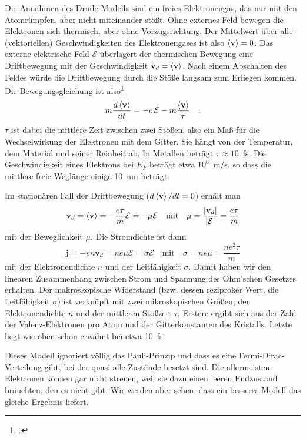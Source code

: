 Die Annahmen des Drude-Modells sind ein freies Elektronengas, das nur mit den  Atomrümpfen, aber nicht miteinander stößt. Ohne externes Feld bewegen die Elektronen sich thermisch, aber ohne Vorzugsrichtung. Der Mittelwert über alle (vektoriellen) Geschwindigkeiten des Elektronengases ist also $\braket{\mathbf{v}} = 0$. Das externe elektrische Feld $\mathcal{E}$ überlagert der thermischen Bewegung eine Driftbewegung mit der Geschwindigkeit $\mathbf{v}_d = \braket{\mathbf{v}}$. Nach einem Abschalten des Feldes würde die Driftbewegung durch die Stöße langsam zum Erliegen kommen. Die Bewegungsgleichung ist also\footcite{Singleton_band_theory,Simon_solid_state_basics}
\begin{equation}
   m \frac{d \braket{\mathbf{v}} }{dt} = -e \, \mathcal{E} - m \frac{\braket{\mathbf{v}} }{\tau} \quad .
\end{equation}
$\tau$ ist dabei die mittlere Zeit zwischen zwei Stößen, also ein Maß für die Wechselwirkung der Elektronen mit dem Gitter. Sie hängt von der Temperatur, dem Material und seiner Reinheit ab. In Metallen beträgt $\tau \approx 10$~fs. Die Geschwindigkeit eines Elektrons bei $E_F$ beträgt etwa $10^6$~m/s, so dass die mittlere freie Weglänge einige 10~nm beträgt.

Im stationären Fall der Driftbewegung
($d \braket{\mathbf{v}} / dt = 0$) erhält man   
\begin{equation}
   \mathbf{v}_d =\braket{\mathbf{v}} =  - \frac{e \tau}{m} \mathcal{E} = - \mu \mathcal{E} 
   \quad \text{mit} \quad
    \mu = \frac{| \mathbf{v}_d |}{|\mathcal{E}|} = \frac{e \tau}{m} \label{eq:2_def_beweglichkeit}
\end{equation}
mit der Beweglichkeit $\mu$. Die Stromdichte ist dann
\begin{equation}
   \mathbf{j} = -e n  \mathbf{v}_d = n e \mu \mathcal{E} = \sigma \mathcal{E} 
   \quad \text{mit} \quad 
   \sigma = n e \mu  = \frac{n e^2 \tau}{m}
\end{equation}
mit der Elektronendichte $n$ und der Leitfähigkeit $\sigma$. Damit haben wir den linearen Zusammenhang zwischen Strom und Spannung des Ohm'schen Gesetzes erhalten. Der makroskopische Widerstand (bzw. dessen reziproker Wert, die Leitfähigkeit $\sigma$) ist verknüpft mit zwei mikroskopischen  Größen, der Elektronendichte $n$ und der mittleren Stoßzeit $\tau$. Erstere ergibt sich aus der Zahl der Valenz-Elektronen pro Atom und der Gitterkonstanten des Kristalls. Letzte liegt wie oben schon erwähnt bei etwa 10~fs.

Dieses Modell ignoriert völlig das Pauli-Prinzip und dass es eine Fermi-Dirac-Verteilung gibt, bei der quasi alle Zustände besetzt sind. Die allermeisten Elektronen können gar nicht streuen, weil sie dazu einen leeren Endzustand bräuchten, den es nicht gibt. Wir werden aber sehen, dass ein besseres Modell das gleiche Ergebnis liefert.

